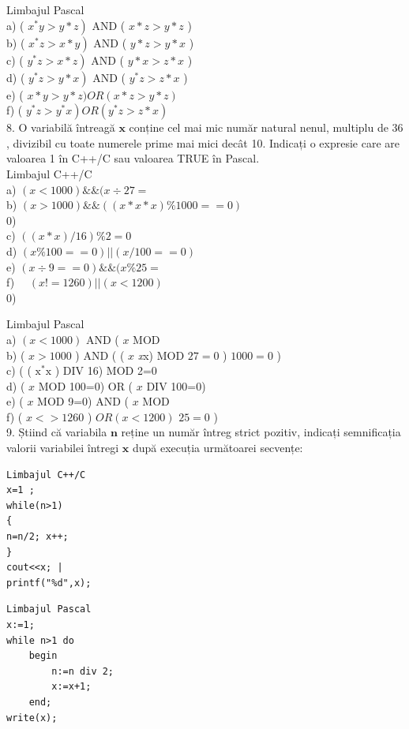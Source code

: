 \documentclass[10pt]{article}
\begin{document}
Limbajul Pascal\\
a) ( $\left.x^{*} y>y * z\right)$ AND ( $x * z>y * z$ )\\
b) ( $\left.x^{*} z>x * y\right)$ AND ( $y * z>y * x$ )\\
c) ( $\left.y^{*} z>x * z\right)$ AND ( $y * x>z * x$ )\\
d) ( $\left.y^{*} z>y * x\right)$ AND ( $y^{*} z>z * x$ )\\
e) ( $x * y>y * z) O R(x * z>y * z)$\\
f) ( $\left.y^{*} z>y^{*} x\right) O R\left(y^{*} z>z * x\right)$\\
8. O variabilă întreagă $\mathbf{x}$ conține cel mai mic număr natural nenul, multiplu de 36 , divizibil cu toate numerele prime mai mici decât 10. Indicați o expresie care are valoarea 1 în C++/C sau valoarea TRUE în Pascal.\\
Limbajul C++/C\\
a) $(x<1000) \& \&(x \div 27=$\\
b) $(x>1000) \& \&((x * x * x) \% 1000==0)$\\
0)\\
c) $((x * x) / 16) \% 2=0$\\
d) $(x \% 100==0)|\mid(x / 100==0)$\\
e) $(x \div 9==0) \& \&(x \% 25=$\\
f) $\quad(x!=1260)|\mid(x<1200)$\\
0)

Limbajul Pascal\\
a) $(x<1000)$ AND ( $x$ MOD\\
b) ( $x>1000$ ) AND ( ( $x$ \textit{x}x) MOD $27=0$ ) $1000=0$ )\\
c) ( ( $\mathrm{x}^{*} \mathrm{x}$ ) DIV 16) MOD 2=0\\
d) ( $x$ MOD 100=0) OR ( $x$ DIV 100=0)\\
e) ( $x$ MOD 9=0) AND ( $x$ MOD\\
f) ( $x<>1260$ ) $O R(x<1200)$ $25=0$ )\\
9. Știind că variabila $\mathbf{n}$ reține un număr întreg strict pozitiv, indicați semnificația valorii variabilei întregi $\mathbf{x}$ după execuția următoarei secvențe:

\begin{verbatim}
Limbajul C++/C
x=1 ;
while(n>1)
{
n=n/2; x++;
}
cout<<x; |
printf("%d",x);
\end{verbatim}

\begin{verbatim}
Limbajul Pascal
x:=1;
while n>1 do
    begin
        n:=n div 2;
        x:=x+1;
    end;
write(x);
\end{verbatim}
\end{document}

